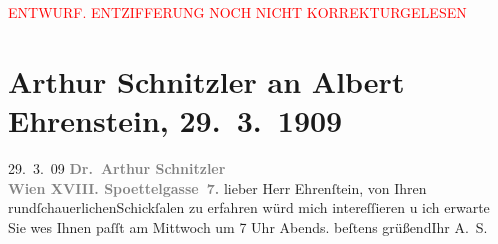 
\begin{center}
            \textcolor{red}{ENTWURF. ENTZIFFERUNG NOCH NICHT KORREKTURGELESEN}
                      \end{center}
            
               \section[Arthur Schnitzler an Albert Ehrenstein, 29. 3. 1909]{ Arthur Schnitzler an Albert Ehrenstein, 29. 3. 1909}\nopagebreak{}\rehead{ }\begin{ledgroupsized}[t]{13cm}\normalsize\beginnumbering{} \toendnotes[C]{\smallbreak\pagebreak[2]} 
\toendnotes[C]{\smallbreak}\pstart
           \raggedleft{}{\pb}29. 3. 09\pend
           \pstart
           \textcolor{gray}{\textbf{Dr. Arthur Schnitzler}}{\\}\textcolor{gray}{\textbf{Wien XVIII. Spoettelgasse 7.}}\pend
           \pstart{}lieber Herr Ehrenſtein,\pend\pstart
           von Ihren rundſchauerlichenSchickſalen zu erfahren würd mich
                    intereſſieren u ich erwarte Sie we{\geminationn}s Ihnen paſſt am
                    Mittwoch um 7 Uhr Abends.\pend
           \pstart beſtens grüßend\hspace*{1.5em}Ihr \spacefill\mbox{A. S.}\pend{}\endnumbering{}\end{ledgroupsized}  \newcommand{\dateiname}{L01836}\newcommand{\titel}{Arthur Schnitzler an Albert Ehrenstein, 29. 3. 1909}\newcommand{\editorInnen}{Martin Anton Müller und Gerd-Hermann Susen}
      